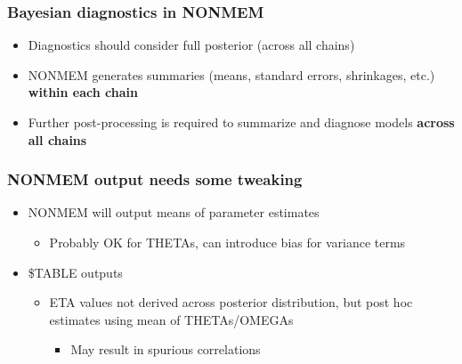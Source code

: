 \documentclass[handout]{beamer}
\begin{document}
\begin{frame}
  \frametitle{Bayesian diagnostics in NONMEM}

\begin{itemize}
  \item Diagnostics should consider full posterior (across all chains)
  \item NONMEM generates summaries (means, standard errors, shrinkages, etc.) \textcolor{mrggreen}{\bf within each chain}
  \item Further post-processing is required to summarize and diagnose models \textcolor{mrggreen}{\bf across all chains}
\end{itemize}

\end{frame}

\begin{frame}
  \frametitle{NONMEM output needs some tweaking}

\begin{itemize}
  \item NONMEM will output means of parameter estimates
        \begin{itemize}
          \item Probably OK for THETAs, can introduce bias for variance terms
        \end{itemize}
  \item \$TABLE outputs
        \begin{itemize}
          \item ETA values not derived across posterior distribution, but post hoc estimates using mean of THETAs/OMEGAs
                \begin{itemize}
                  \item May result in spurious correlations
                \end{itemize}
        \end{itemize}
\end{itemize}

\end{frame}
\end{document}
